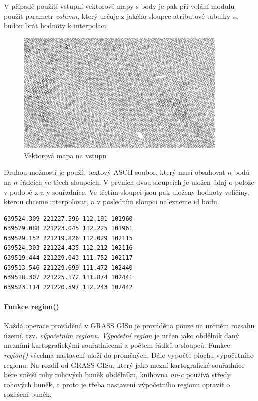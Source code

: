 \documentclass[12pt,a4paper]{article}
\begin{document}
V případě použití vstupní vektorové mapy s body je pak při volání modulu použit parametr \emph{column}, který určuje z jakého sloupce atributové tabulky se budou brát hodnoty k interpolaci.

\begin{figure}[h!]
\centering
\includegraphics[width=0.9\textwidth]{img/vstup_vect_map.png}
\caption{Vektorová mapa na vstupu}
\label{fig:vstup_vect_map}
\end{figure}

\newpage
Druhou možností je použít textový ASCII soubor, který musí obsahovat $n$ bodů na $n$ řádcích ve třech sloupcích. V prvních dvou sloupcích je uložen údaj o poloze v podobě x a y souřadnice. Ve třetím sloupci jsou pak uloženy hodnoty veličiny, kterou chceme interpolovat, a v posledním sloupci nalezneme id bodu.

\begin{lstlisting}[caption={Příklad vstupního souboru}]
639524.309 221227.596 112.191 101960
639529.088 221223.045 112.225 101961
639529.152 221219.826 112.029 102115
639524.303 221224.435 112.212 102116
639519.444 221229.043 111.752 102117
639513.546 221229.699 111.472 102440
639518.307 221225.172 111.874 102441
639523.114 221220.597 112.243 102442
\end{lstlisting}

\bigskip
\paragraph{Funkce region()}
Každá operace prováděná v GRASS GISu je prováděna pouze na určitém rozsahu území, tzv. \emph{výpočetním regionu}. \emph{Výpočetní region} je určen jako obdélník daný mezními kartografickými souřadnicemi a počtem řádků a sloupců. 
Funkce \emph{region()} všechna nastavení uloží do proměných. Dále vypočte plochu výpočetního regionu. Na rozdíl od GRASS GISu, který jako mezní kartografické souřadnice bere vnější rohy rohových buněk obdélníku, knihovna \emph{nn-c} používá středy rohových buněk, a proto je třeba nastavení výpočetního regionu opravit o rozlišení buněk.
\end{document}
